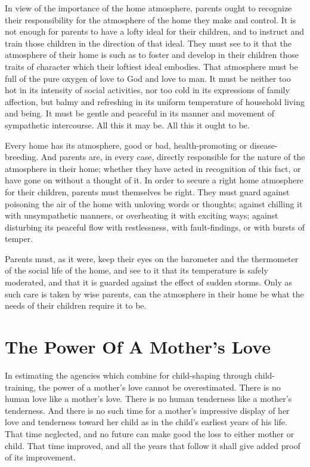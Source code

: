 \documentclass[
]{book}
\begin{document}
In view of the importance of the home atmosphere, parents ought to recognize their responsibility for the atmosphere of the home they make and control. It is not enough for parents to have a lofty ideal for their children, and to instruct and train those children in the direction of that ideal. They must see to it that the atmosphere of their home is such as to foster and develop in their children those traits of character which their loftiest ideal embodies. That atmosphere must be full of the pure oxygen of love to God and love to man. It must be neither too hot in its intensity of social activities, nor too cold in its expressions of family affection, but balmy and refreshing in its uniform temperature of household living and being. It must be gentle and peaceful in its manner and movement of sympathetic intercourse. All this it may be. All this it ought to be.

Every home has its atmosphere, good or bad, health-promoting or disease-breeding. And parents are, in every case, directly responsible for the nature of the atmosphere in their home; whether they have acted in recognition of this fact, or have gone on without a thought of it. In order to secure a right home atmosphere for their children, parents must themselves be right. They must guard against poisoning the air of the home with unloving words or thoughts; against chilling it with unsympathetic manners, or overheating it with exciting ways; against disturbing its peaceful flow with restlessness, with fault-findings, or with bursts of temper.

Parents must, as it were, keep their eyes on the barometer and the thermometer of the social life of the home, and see to it that its temperature is safely moderated, and that it is guarded against the effect of sudden storms. Only as such care is taken by wise parents, can the atmosphere in their home be what the needs of their children require it to be.

\hypertarget{the-power-of-a-mothers-love}{%
\chapter{The Power Of A Mother's Love}\label{the-power-of-a-mothers-love}}

In estimating the agencies which combine for child-shaping through child-training, the power of a mother's love cannot be overestimated. There is no human love like a mother's love. There is no human tenderness like a mother's tenderness. And there is no such time for a mother's impressive display of her love and tenderness toward her child as in the child's earliest years of his life. That time neglected, and no future can make good the loss to either mother or child. That time improved, and all the years that follow it shall give added proof of its improvement.
\end{document}
